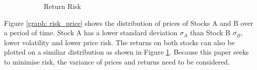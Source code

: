 \documentclass[a4paper,12pt]{report}
\numberwithin{equation}{section}
\theoremstyle{definition}
\begin{document}
\begin{figure}[H]
\begin{subfigure}{.475\linewidth}
        \caption{Return Risk}
    \label{graph: risk_returns}
  \end{subfigure}
  \caption{}
  \label{figure: risk_volatility_main}
\end{figure}

Figure \ref{graph: risk_price} shows the distribution of prices of Stocks A and B over a period of time. Stock A has a lower standard deviation $\sigma_A$ than Stock B $\sigma_B$, lower volatility and lower price risk.  The returns on both stocks can also be plotted on a similiar distribution as shown in Figure \ref{graph: risk_returns}. Because this paper seeks to minimise risk, the variance of prices and returns need to be considered.
\end{document}
